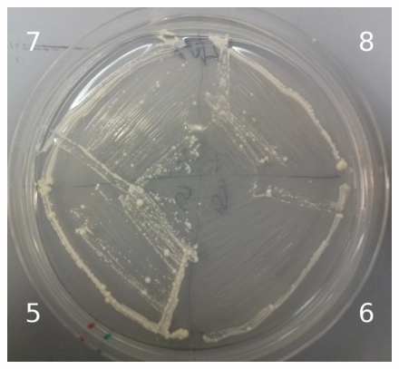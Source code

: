 \documentclass{beamer}
\begin{document}
\begin{frame}
\begin{minipage}[ht!]{.48\textwidth}
\begin{figure}[ht!]
            \label{fig:pcr}
        \end{figure}
    \end{minipage}
    \hfill
    \begin{minipage}[ht!]{.48\textwidth}
         \begin{figure}[ht!]
            \centering
            \includegraphics[width=.9\textwidth]{TRPrestreak1205b.png}
            \label{fig:pcr}
        \end{figure}
    \end{minipage}
\end{frame}
\end{document}
